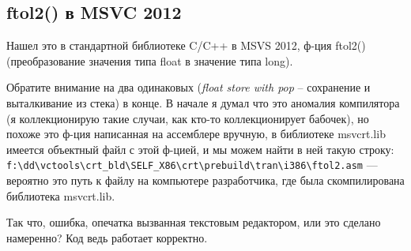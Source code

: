 \subsection{ftol2() в MSVC 2012}

Нашел это в стандартной библиотеке C/C++ в MSVS 2012, ф-ция ftol2() (преобразование значения типа float в значение типа long).



Обратите внимание на два одинаковых  (\emph{float store with pop} -- сохранение и выталкивание из стека) в конце. 
В начале я думал что это аномалия компилятора (я коллекционирую такие случаи, как кто-то коллекционирует бабочек),
но похоже это ф-ция написанная на ассемблере вручную, в библиотеке msvcrt.lib имеется объектный файл с этой ф-цией,
и мы можем найти в ней такую строку:\\
\verb|f:\dd\vctools\crt_bld\SELF_X86\crt\prebuild\tran\i386\ftol2.asm| ---
вероятно это путь к файлу на компьютере разработчика, где была скомпилирована библиотека msvcrt.lib.

Так что, ошибка, опечатка вызванная текстовым редактором, или это сделано намеренно?
Код ведь работает корректно.

